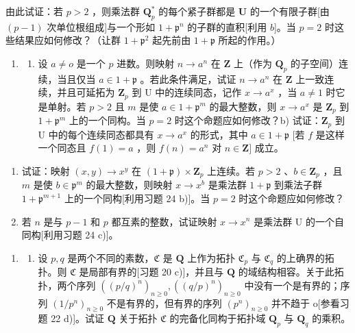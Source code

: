 由此试证：若 \(p > 2\) ，则乘法群 \(\mathbf{Q}_p^*\) 的每个紧子群都是 \(\mathbf{U}\) 的一个有限子群{[}由 \((p - 1)\) 次单位根组成{]}与一个形如 \(1 + \mathfrak{p}^n\) 的子群的直积{[}利用 \(b\){]}。当 \(p = 2\) 时这些结果应如何修改？（让群 \(1 + \mathfrak{p}^2\) 起先前由 \(1 + \mathfrak{p}\) 所起的作用。）

\begin{enumerate}
\def\labelenumi{(\arabic{enumi})}
\setcounter{enumi}{24}
\tightlist
\item
  \begin{enumerate}
  \def\labelenumii{\alph{enumii})}
  \tightlist
  \item
    设 \(a \neq o\) 是一个 \(p\) 进数。则映射 \(n \to a^n\) 在 \(\mathbf{Z}\) 上（作为 \(\mathbf{Q}_p\) 的子空间）连续，当且仅当 \(a \in 1 + \mathfrak{p}\) 。若此条件满足，试证 \(n \to a^n\) 在 \(\mathbf{Z}\) 上一致连续，并且可延拓为 \(\mathbf{Z}_p\) 到 U 中的连续同态，记作 \(x \to a^x\) ，当 \(a \neq 1\) 时它是单射。若 \(p > 2\) 且 \(m\) 是使 \(a \in 1 + \mathfrak{p}^m\) 的最大整数，则 \(x \to a^x\) 是 \(\mathbf{Z}_p\) 到 \(1 + \mathfrak{p}^m\) 上的一个同构。当 \(p = 2\) 时这个命题应如何修改？b) 试证：\(\mathbf{Z}_p\) 到 U 中的每个连续同态都具有 \(x \to a^x\) 的形式，其中 \(a \in 1 + \mathfrak{p}\) {[}若 \(f\) 是这样一个同态且 \(f(1) = a\) ，则 \(f(n) = a^n\) 对 \(n \in \mathbf{Z}]\) 成立。
  \end{enumerate}
\end{enumerate}

\begin{enumerate}
\def\labelenumi{\alph{enumi})}
\setcounter{enumi}{2}
\item
  试证：映射 \((x, y) \to x^y\) 在 \((1 + \mathfrak{p}) \times \mathbf{Z}_p\) 上连续。若 \(p > 2\) 、\(b \in \mathbf{Z}_p\) ，且 \(m\) 是使 \(b \in \mathfrak{p}^m\) 的最大整数，则映射 \(x \to x^b\) 是乘法群 \(1 + \mathfrak{p}\) 到乘法子群 \(1 + \mathfrak{p}^{m+1}\) 上的一个同构{[}利用习题 24 b){]}。当 \(p = 2\) 时这个命题应如何修改？
\item
  若 \(n\) 是与 \(p - 1\) 和 \(p\) 都互素的整数，试证映射 \(x \to x^n\) 是乘法群 U 的一个自同构{[}利用习题 24 c){]}。
\end{enumerate}

\begin{enumerate}
\def\labelenumi{\arabic{enumi})}
\setcounter{enumi}{25}
\tightlist
\item
  \begin{enumerate}
  \def\labelenumii{\alph{enumii})}
  \tightlist
  \item
    设 \(p, q\) 是两个不同的素数，\(\mathfrak{C}\) 是 \(\mathbf{Q}\) 上作为拓扑 \(\mathfrak{C}_p\) 与 \(\mathfrak{C}_q\) 的上确界的拓扑。则 \(\mathfrak{C}\) 是局部有界的{[}习题 20 c){]}，并且与 \(\mathbf{Q}\) 的域结构相容。关于此拓扑，两个序列 \(((p/q)^n)_{n\geqslant 0}, ((q/p)^n)_{n\geqslant 0}\) 中没有一个是有界的；序列 \((1/p^n)_{n\geqslant 0}\) 不是有界的，但有界的序列 \((p^n)_{n\geqslant 0}\) 并不趋于 o{[}参看习题 22 d){]}。试证 \(\mathbf{Q}\) 关于拓扑 \(\mathfrak{C}\) 的完备化同构于拓扑域 \(\mathbf{Q}_p\) 与 \(\mathbf{Q}_q\) 的乘积。
  \end{enumerate}
\end{enumerate}

